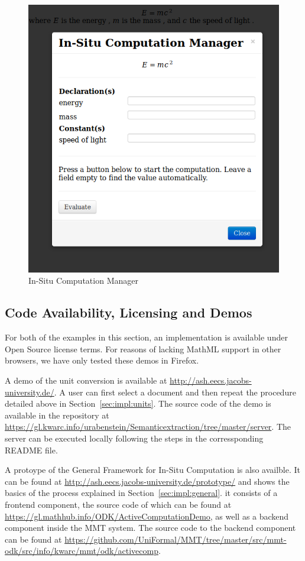   \begin{figure}[ht]\centering
    \includegraphics[width=12cm]{screenshots/compman}
    \caption{In-Situ Computation Manager}\label{fig:compman}
  \end{figure}

\subsection{Code Availability, Licensing and Demos}

For both of the examples in this section, an implementation is available under Open Source license terms.
For reasons of lacking MathML support in other browsers, we have only tested these demos in Firefox.

A demo of the unit conversion is available at \url{http://ash.eecs.jacobs-university.de/}.
A user can first select a document and then repeat the procedure detailed above in Section~\ref{sec:impl:units}.
The source code of the demo is available in the repository at \url{https://gl.kwarc.info/urabenstein/Semanticextraction/tree/master/server}.
The server can be executed locally following the steps in the corressponding README file.

A protoype of the General Framework for In-Situ Computation is also availble.
It can be found at \url{http://ash.eecs.jacobs-university.de/prototype/} and shows the basics of the process explained in Section~\ref{sec:impl:general}.
it consists of a frontend component, the source code of which can be found at \url{https://gl.mathhub.info/ODK/ActiveComputationDemo}, as well as a backend component inside the MMT system.
The source code to the backend component can be found at \url{https://github.com/UniFormal/MMT/tree/master/src/mmt-odk/src/info/kwarc/mmt/odk/activecomp}.

